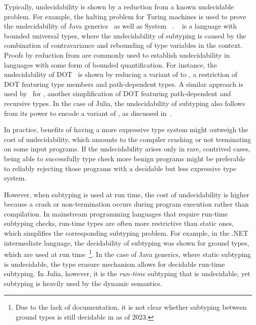 Typically, undecidability is shown by a reduction from a known undecidable
problem. For example, the halting problem for Turing machines is used
to prove the undecidability of Java generics~\cite{grigore:java-undec:2017}
as well as System \FSub~\cite{pierce:bound-sub-undec:1992}.
\FSub~\cite{cardelli:fsub:1991} is a language with bounded universal types,
where the undecidability of subtyping is caused by the combination of
contravariance and rebounding of type variables in the context.
Proofs by reduction from \FSub are commonly used to establish
undecidability in languages with some form of bounded quantification.
For instance, the undecidability of DOT~\cite{hu:dot-undec:2020} is shown
by reducing a variant of \FSub to \DSub, a restriction of DOT featuring type
members and path-dependent types. A similar approach is used
by~\citet{mackay:path-dep-dec:2020} for \WyvCore, another simplification of
DOT featuring path-dependent and recursive types.
In the case of Julia, the undecidability of subtyping also follows from its
power to encode a variant of \FSub,
as discussed in~.

In practice, benefits of having a more expressive type system might outweigh
the cost of undecidability, which amounts to the compiler crashing or
not terminating on some input programs.
If the undecidability arises only in rare, contrived cases,
being able to successfully type check more benign programs
might be preferable to reliably rejecting those
programs with a decidable but less expressive type system.

However, when subtyping is used at run time, the cost of undecidability is
higher because a crash or non-termination occurs during program execution
rather than compilation.
In mainstream programming languages that require run-time subtyping checks,
run-time types are often more restrictive than static ones,
which simplifies the corresponding subtyping problem.
For example, in the .NET intermediate language,
the decidability of subtyping was shown for ground types,
which are used at run time~\cite{kennedy:nom-sub-var-dec:2007}\footnote{Due
to the lack of documentation, it is not clear whether subtyping between ground
types is still decidable in \CSharp as of 2023.}.
In the case of Java generics, where static subtyping is undecidable,
the type erasure mechanism allows for decidable run-time subtyping.
In Julia, however, it is the \emph{run-time} subtyping that is undecidable,
yet subtyping is heavily used by the dynamic semantics.


